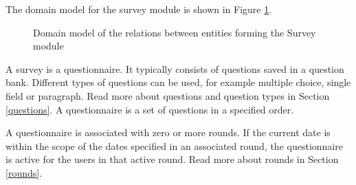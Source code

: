 The domain model for the survey module is shown in Figure \ref{fig:survey_domainModel}.

\begin{figure}[htb]
\begin{center}
\end{center}
\caption{ Domain model of the relations between entities forming the Survey module \label{fig:survey_domainModel}}
\end{figure}


A survey is a questionnaire. It typically consists of questions saved in a question bank. Different types of questions can be used, for example multiple choice, single field or paragraph. Read more about questions and question types in Section \ref{questions}. A questionnaire is a set of questions in a specified order.

A questionnaire is associated with zero or more rounds. If the current date is within the scope of the dates specified in an associated round, the questionnaire is active for the users in that active round. Read more about rounds in Section \ref{rounds}. 
